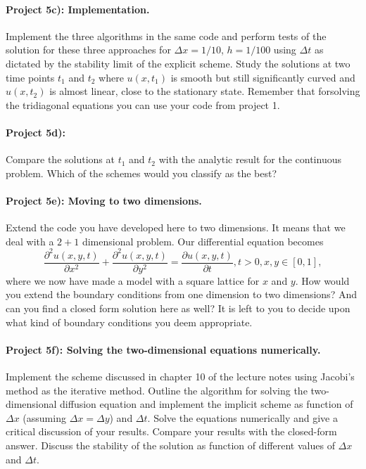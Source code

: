 \documentclass[%
oneside,                 %
final,                   %
10pt]{article}
\begin{document}
\paragraph{Project 5c): Implementation.}
Implement the three algorithms in the same code and perform tests of the solution 
for these three approaches
for $\Delta x=1/10$, $h=1/100$ using  $\Delta t$ as dictated by the stability limit of the explicit scheme.
Study the solutions at two time points $t_1$ and $t_2$ where $u(x,t_1)$ is smooth but still significantly curved
and $u(x,t_2)$ is almost linear, close to the stationary state.
Remember that forsolving the tridiagonal equations you can use your code from project 1.  
\paragraph{Project 5d):}
Compare the solutions at $t_1$ and $t_2$ with the analytic result for the continuous problem.
Which of the schemes would you classify as the best?

\paragraph{Project 5e): Moving to two dimensions.}
Extend the code you have developed here to two
  dimensions. 
It means that we deal with a $2+1$ dimensional problem. Our differential equation becomes
\[
 \frac{\partial^2 u(x,y,t)}{\partial x^2}+\frac{\partial^2 u(x,y,t)}{\partial y^2} =\frac{\partial u(x,y,t)}{\partial t}, t> 0, x,y\in [0,1],
\]
where we now have made a model with a square lattice for $x$ and $y$. 
How would you extend the boundary conditions from one dimension to two dimensions? And can you
  find a closed form solution here as well?  It is left to you to decide upon what kind of boundary conditions
you deem appropriate.
\paragraph{Project 5f): Solving the two-dimensional equations numerically.}
Implement the  scheme discussed in chapter 10 of the lecture notes using Jacobi's method as the iterative method.
Outline the algorithm for solving the two-dimensional diffusion equation and 
implement the implicit scheme as function of $\Delta x$ (assuming
$\Delta x = \Delta y$) and $\Delta t$. Solve the equations numerically and give a critical discussion of your results. 
Compare your results with the closed-form answer. Discuss the stability
of the solution as function of different values of $\Delta x$  and $\Delta t$. 
\end{document}
